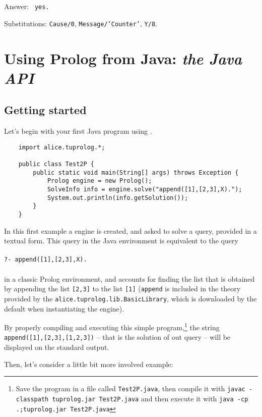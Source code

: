 Answer: \texttt{ yes.}

Substitutions: \texttt{Cause/0}, \texttt{Message/'Counter'}, \texttt{Y/8}.


\section{Using Prolog from Java: \textit{the Java API}}
\label{sec:java-api}

\subsection{Getting started}

Let's begin with your first Java program using \tuprolog{}.
%
{\small{
\begin{verbatim}
    import alice.tuprolog.*;

    public class Test2P {
        public static void main(String[] args) throws Exception {
            Prolog engine = new Prolog();
            SolveInfo info = engine.solve("append([1],[2,3],X).");
            System.out.println(info.getSolution());
        }
    }
\end{verbatim}
}}
\noindent In this first example a \tuprolog{} engine is
created, and asked to solve a query, provided in a textual form.
%
This query in the Java environment is equivalent to the query\\\\
%
{\small{\texttt{?- append([1],[2,3],X).\\\\}}}
%
\noindent in a classic Prolog environment, and accounts for
finding the list that is obtained by appending the list
\texttt{[2,3]} to the list \texttt{[1]} (\texttt{append} is
included in the theory provided by the
\texttt{alice.tuprolog.lib.BasicLibrary}, which is downloaded by
the default when instantiating the engine).
%

By properly compiling and executing this simple program,\footnote{Save the program in a file called \texttt{Test2P.java}, then compile it with
%
\texttt{javac -classpath tuprolog.jar Test2P.java}
%
and then execute it with
%
\texttt{java -cp .;tuprolog.jar Test2P.java}} the string
\texttt{append([1],[2,3],[1,2,3])} -- that is the solution of out
query -- will be displayed on the standard output.
%
%

\noindent Then, let's consider a little bit more involved example:

